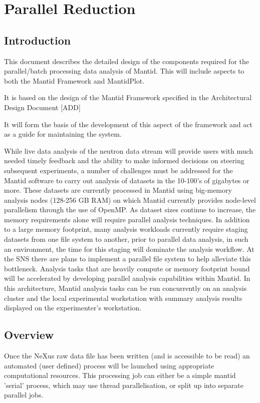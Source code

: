 \section{Parallel Reduction}

\subsection{Introduction}
This document describes the detailed design of the components required for the parallel/batch processing data analysis of Mantid.  This will include aspects to both the Mantid Framework and MantidPlot.  


It is based on the design of the Mantid Framework specified in the Architectural Design Document [ADD]


It will form the basis of the development of this aspect of the framework and act as a guide for maintaining the system.

While live data analysis of the neutron data stream will provide users with much needed timely feedback and the ability to make informed decisions on steering subsequent experiments, a number of challenges must be addressed for the Mantid software to carry out analysis of datasets in the 10-100's of gigabytes or more. These datasets are currently processed in Mantid using big-memory analysis nodes (128-256 GB RAM) on which Mantid currently provides node-level parallelism through the use of OpenMP. As dataset sizes continue to increase, the memory requirements alone will require parallel analysis techniques. In addition to a large memory footprint, many analysis workloads currently require staging datasets from one file system to another, prior to parallel data analysis, in such an environment, the time for this staging will dominate the analysis workflow.  At the SNS there are plans to implement a parallel file system to help alleviate this bottleneck.  Analysis tasks that are heavily compute or memory footprint bound will be accelerated by developing parallel analysis capabilities within Mantid. In this architecture, Mantid analysis tasks can be run concurrently on an analysis cluster and the local experimental workstation with summary analysis results displayed on the experimenter's workstation.

\subsection{Overview}

Once the NeXus raw data file has been written (and is accessible to be read) an automated (user defined) process will be launched using appropriate computational resources.  This processing job can either be a simple mantid 'serial' process, which may use thread parallelisation, or split up into separate parallel jobs.  

